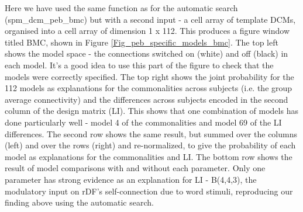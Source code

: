 \documentclass{article}
\begin{document}
Here we have used the same function as for the automatic search (spm\_dcm\_peb\_bmc) but with a second input - a cell array of template DCMs, organised into a cell array of dimension 1 x 112. This produces a figure window titled BMC, shown in Figure \ref{Fig_peb_specific_models_bmc}. The top left shows the model space - the connections switched on (white) and off (black) in each model. It's a good idea to use this part of the figure to check that the models were correctly specified. The top right shows the joint probability for the 112 models as explanations for the commonalities across subjects (i.e. the group average connectivity) and the differences across subjects encoded in the second column of the design matrix (LI). This shows that one combination of models has done particularly well - model 4 of the commonalities and model 69 of the LI differences. The second row shows the same result, but summed over the columns (left) and over the rows (right) and re-normalized, to give the probability of each model as explanations for the commonalities and LI. The bottom row shows the result of model comparisons with and without each parameter. Only one parameter has strong evidence as an explanation for LI - B(4,4,3), the modulatory input on rDF's self-connection due to word stimuli, reproducing our finding above using the automatic search.
\end{document}
